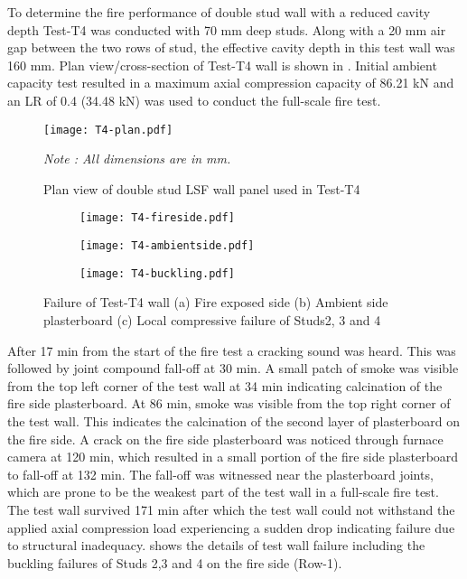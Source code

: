 To determine the fire performance of double stud wall with a reduced cavity depth Test-T4 was conducted with 70 mm deep studs. Along with a 20 mm air gap between the two rows of stud, the effective cavity depth in this test wall was 160 mm. Plan view/cross-section of Test-T4 wall is shown in . Initial ambient capacity test resulted in a maximum axial compression capacity of 86.21 kN and an LR of 0.4 (34.48 kN) was used to conduct the full-scale fire test.      
\begin{figure}[!htbp]
	\centering
	\texttt{[image: T4-plan.pdf]}
	\caption{Plan view of double stud LSF wall panel used in Test-T4}
	\label{fig:T4-plan}
	\fontsize{10}{1}\textit{Note : All dimensions are in mm.}
\end{figure}
\begin{figure}[!htbp]
	\centering
	\begin{subfigure}[b]{0.4\textwidth}
		\centering
		\texttt{[image: T4-fireside.pdf]}
		\caption{}
		\label{subfig:T4-fireside}
	\end{subfigure}
	\begin{subfigure}[b]{0.4\textwidth}
		\centering
		\texttt{[image: T4-ambientside.pdf]}
		\caption{}
		\label{subfig:T4-ambientside}
	\end{subfigure}
	\begin{subfigure}[b]{0.4\textwidth}
		\centering
		\texttt{[image: T4-buckling.pdf]}
		\caption{}
		\label{subfig:T4-buckling}
	\end{subfigure}
	   \caption{Failure of Test-T4 wall (a) Fire exposed side (b) Ambient side plasterboard (c) Local compressive failure of Studs2, 3 and 4}
	   \label{fig:T4-failure}
\end{figure}

After 17 min from the start of the fire test a cracking sound was heard. This was followed by joint compound fall-off at 30 min. A small patch of smoke was visible from the top left corner of the test wall at 34 min indicating calcination of the fire side plasterboard. At 86 min, smoke was visible from the top right corner of the test wall. This indicates the calcination of the second layer of plasterboard on the fire side. A crack on the fire side plasterboard was noticed through furnace camera at 120 min, which resulted in a small portion of the fire side plasterboard to fall-off at 132 min. The fall-off was witnessed near the plasterboard joints, which are prone to be the weakest part of the test wall in a full-scale fire test. The test wall survived 171 min after which the test wall could not withstand the applied axial compression load experiencing a sudden drop indicating failure due to structural inadequacy.  shows the details of test wall failure including the buckling failures of Studs 2,3 and 4 on the fire side (Row-1).

